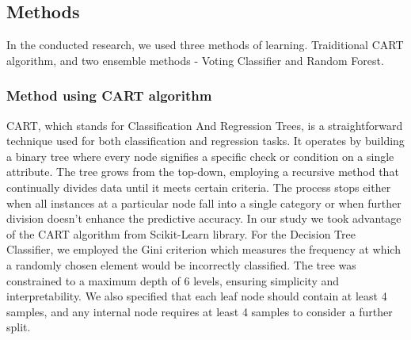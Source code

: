 





% 


\subsection{Methods}

In the conducted research, we used three methods of learning. Traiditional CART algorithm, and two ensemble methods - Voting Classifier and Random Forest.


\subsubsection{Method using CART algorithm}
CART, which stands for Classification And Regression Trees, is a straightforward technique used for both classification and regression tasks. It operates by building a binary tree where every node signifies a specific check or condition on a single attribute. The tree grows from the top-down, employing a recursive method that continually divides data until it meets certain criteria. The process stops either when all instances at a particular node fall into a single category or when further division doesn't enhance the predictive accuracy. 
In our study we took advantage of the CART algorithm from Scikit-Learn library. For the Decision Tree Classifier, we employed the Gini criterion which measures the frequency at which a randomly chosen element would be incorrectly classified. The tree was constrained to a maximum depth of 6 levels, ensuring simplicity and interpretability. We also specified that each leaf node should contain at least 4 samples, and any internal node requires at least 4 samples to consider a further split.  

